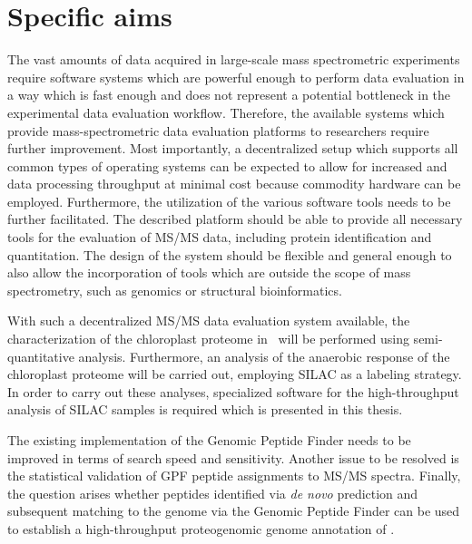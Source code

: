\cleardoublepage
\chapter{Specific aims}

The vast amounts of data acquired in large-scale mass spectrometric experiments
require software systems which are powerful enough to perform data evaluation
in a way which is fast enough and does not represent a potential bottleneck in 
the experimental data evaluation workflow.
Therefore, the available systems which provide mass-spectrometric data 
evaluation platforms to researchers require further improvement.
Most importantly, a decentralized setup which supports all common types of 
operating systems can be expected to allow for increased and data processing 
throughput at minimal cost because commodity hardware can be employed.
Furthermore, the utilization of the various software tools needs to be further 
facilitated.
The described platform should be able to provide all necessary tools for
the evaluation of MS/MS data, including protein identification and quantitation.
The design of the system should be flexible and general enough to also
allow the incorporation of tools which are outside the scope of mass 
spectrometry, such as genomics or structural bioinformatics.

With such a decentralized MS/MS data evaluation system available, the
characterization of the chloroplast proteome in \cre~will be performed using
semi-quantitative analysis.
Furthermore, an analysis of the anaerobic response of the chloroplast proteome
will be carried out, employing SILAC as a labeling strategy.
In order to carry out these analyses, specialized software for the 
high-throughput analysis of SILAC samples is required which is presented 
in this thesis.

The existing implementation of the Genomic Peptide Finder needs to
be improved in terms of search speed and sensitivity.
Another issue to be resolved is the statistical validation of GPF peptide 
assignments to MS/MS spectra.
Finally, the question arises whether peptides identified via {\em de novo} 
prediction and subsequent matching to the genome via the Genomic Peptide Finder 
can be used to establish a high-throughput proteogenomic genome annotation 
of \cre.
